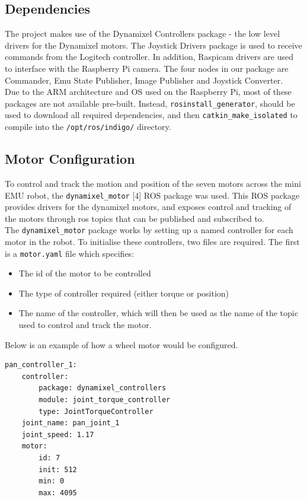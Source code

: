 \documentclass[titlepage,12pt,a4paper]{article}
\begin{document}
\subsection{Dependencies}

\noindent The project makes use of the Dynamixel Controllers package - the low level drivers for the Dynamixel motors. The Joystick Drivers package is used to receive commands from the Logitech controller. In addition, Raspicam drivers are used to interface with the Raspberry Pi camera.
The four nodes in our package are Commander, Emu State Publisher, Image Publisher and Joystick Converter.\\

\noindent Due to the ARM architecture and OS used on the Raspberry Pi, most of these packages are not available pre-built. Instead, \texttt{rosinstall\_generator}, should be used to download all required dependencies, and then \texttt{catkin\_make\_isolated} to compile into the \texttt{/opt/ros/indigo/} directory.

\subsection{Motor Configuration}
To control and track the motion and position of the seven motors across the mini EMU robot, the \texttt{dynamixel\_motor} [4] ROS package was used. This ROS package provides drivers for the dynamixel motors, and exposes control and tracking of the motors through ros topics that can be published and subscribed to. \\

\noindent The \texttt{dynamixel\_motor} package works by setting up a named controller for each motor in the robot. To initialise these controllers, two files are required. The first is a \texttt{motor.yaml} file which specifies:
\begin{itemize}
    \item The id of the motor to be controlled
    \item The type of controller required (either torque or position)
    \item The name of the controller, which will then be used as the name of the topic used to control and track the motor.
\end{itemize}
Below is an example of how a wheel motor would be configured.

\begin{lstlisting}
pan_controller_1:
    controller:
        package: dynamixel_controllers
        module: joint_torque_controller
        type: JointTorqueController
    joint_name: pan_joint_1
    joint_speed: 1.17
    motor:
        id: 7
        init: 512
        min: 0
        max: 4095
\end{lstlisting}
\end{document}

